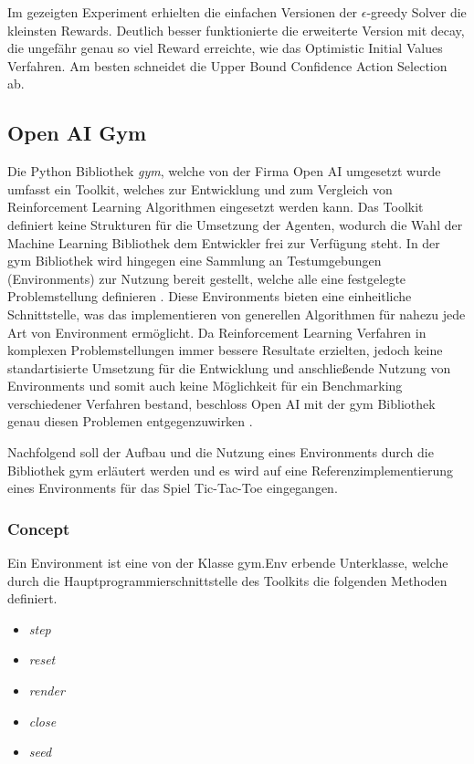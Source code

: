 \documentclass[11pt]{scrartcl}
\begin{document}
\noindent
Im gezeigten Experiment erhielten die einfachen Versionen der $\epsilon$-greedy Solver die
kleinsten Rewards. Deutlich besser funktionierte die erweiterte Version mit decay, die
ungefähr genau so viel Reward erreichte, wie das Optimistic Initial Values Verfahren. Am
besten schneidet die Upper Bound Confidence Action Selection ab.

\newpage
\subsection{Open AI Gym}
Die Python Bibliothek \textit{gym}, welche von der Firma Open AI umgesetzt wurde umfasst ein
Toolkit, welches zur Entwicklung und zum Vergleich von Reinforcement Learning Algorithmen
eingesetzt werden kann. Das Toolkit definiert keine Strukturen für die Umsetzung der Agenten,
wodurch die Wahl der Machine Learning Bibliothek dem Entwickler frei zur Verfügung steht. In
der gym Bibliothek wird hingegen eine Sammlung an Testumgebungen (Environments) zur Nutzung
bereit gestellt, welche alle eine festgelegte Problemstellung definieren \cite{OAI2016}. 
Diese Environments bieten eine einheitliche Schnittstelle, was das implementieren von
generellen Algorithmen für nahezu jede Art von Environment ermöglicht. Da Reinforcement
Learning Verfahren in komplexen Problemstellungen immer bessere Resultate erzielten, jedoch
keine standartisierte Umsetzung für die Entwicklung und anschließende Nutzung von Environments
und somit auch keine Möglichkeit für ein Benchmarking verschiedener Verfahren bestand,
beschloss Open AI mit der gym Bibliothek genau diesen Problemen entgegenzuwirken
\cite{OAI2016}.

Nachfolgend soll der Aufbau und die Nutzung eines Environments durch die Bibliothek gym
erläutert werden und es wird auf eine Referenzimplementierung eines Environments für das
Spiel Tic-Tac-Toe eingegangen.

\subsubsection{Concept}
Ein Environment ist eine von der Klasse gym.Env erbende Unterklasse, welche durch die
Hauptprogrammierschnittstelle des Toolkits die folgenden Methoden definiert.

\begin{itemize}
\itemsep-6pt
\item \textit{step}
\item \textit{reset}
\item \textit{render}
\item \textit{close}
\item \textit{seed}
\end{itemize}  
\end{document}
